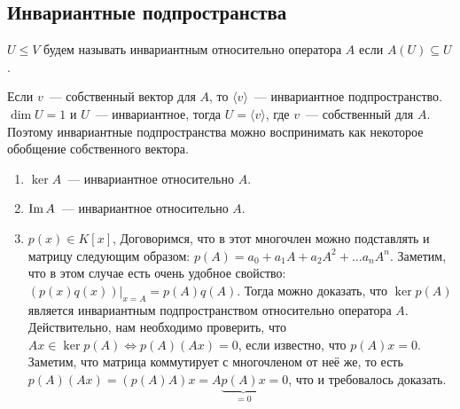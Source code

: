 \subsection{Инвариантные подпространства}
\begin{definition}
    $U\le V$ будем называть инвариантным относительно оператора $A$ если $A(U) \subseteq U$.
\end{definition}
\begin{remark}
    Если $v$~--- собственный вектор для $A$, то $\langle v \rangle$~--- инвариантное подпространство.
    $\dim U = 1$ и $U$~--- инвариантное, тогда $U = \langle v\rangle$, где  $v$~--- собственный для $A$.
    Поэтому инвариантные подпространства можно воспринимать как некоторое 
    обобщение собственного вектора.
\end{remark}
\begin{examples}
    \begin{enumerate}
        \item
            $\ker A$~--- инвариантное относительно $A$.
        \item
             $\operatorname{Im} A$~--- инвариантное относительно $A$.
         \item
             $p(x)\in K[x]$, Договоримся, что в этот многочлен можно подставлять и матрицу
             следующим образом: $p(A) = a_0 + a_1 A + a_2 A^2 + \dots a_n A^n$.
             Заметим, что в этом случае есть очень удобное свойство:
             $(p(x)q(x))|_{x = A} = p(A)q(A)$. Тогда можно доказать, что $\ker p(A)$ является
             инвариантным подпространством относительно оператора $A$. Действительно, нам необходимо
             проверить, что $Ax \in \ker p(A) \Leftrightarrow p(A)(Ax) = 0$, если известно, что $p(A)x = 0$.
             Заметим, что матрица коммутирует с многочленом от неё же,
             то есть $p(A)(Ax) = (p(A)A)x = A\underbrace{p(A)x}_{=0} = 0$, что и требовалось
             доказать.
     \end{enumerate}
\end{examples}
